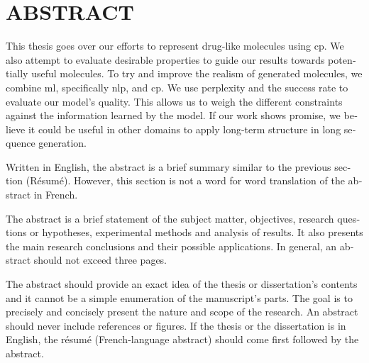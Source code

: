 \documentclass[../Document.tex]{subfiles}
\begin{document}

\chapter*{ABSTRACT}\thispagestyle{headings}
%
\begin{otherlanguage}{english}

This thesis goes over our efforts to represent drug-like molecules using \acrlong{cp}.
We also attempt to evaluate desirable properties to guide our results towards potentially useful molecules.
To try and improve the realism of generated molecules, we combine \acrlong{ml}, specifically \acrlong{nlp}, and \acrlong{cp}.
We use perplexity and the success rate to evaluate our model's quality. This allows us to weigh the different constraints against the information learned by the model.
If our work shows promise, we believe it could be useful in other domains to apply long-term structure in long sequence generation.


Written in English, the abstract is a brief summary similar to the previous
section {(Résumé)}. However, this section is not a
word for word translation of the abstract in French.

The abstract is a brief statement of the subject matter, objectives, research questions or hypotheses, experimental methods and analysis of results. It also presents the main research conclusions and their possible applications. In general, an abstract should not exceed three pages.

The abstract should provide an exact idea of the thesis or dissertation’s contents and it cannot be a simple enumeration of the manuscript’s parts. The goal is to precisely and concisely present the nature and scope of the research. An abstract should never include references or figures. If the thesis or the dissertation is in English, the résumé (French-language abstract) should come first followed by the abstract.

\end{otherlanguage}
\end{document}
